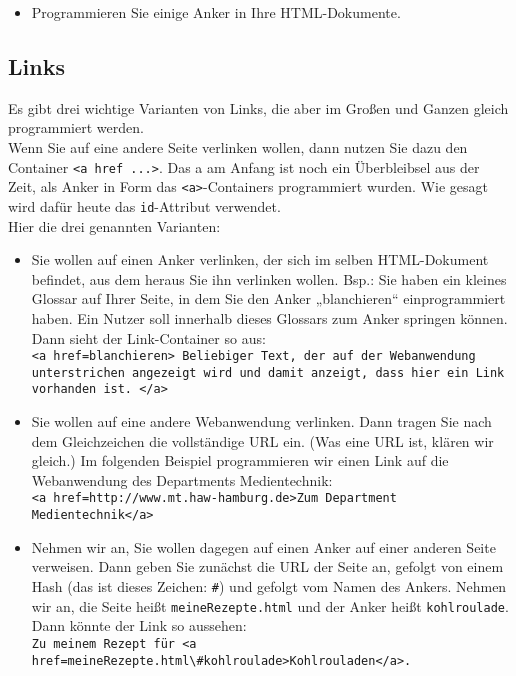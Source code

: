 \begin{itemize}
	\item Programmieren Sie einige Anker in Ihre HTML-Dokumente.
\end{itemize}

\subsection{Links}

Es gibt drei wichtige Varianten von Links, die aber im Großen und Ganzen gleich programmiert werden.\\

Wenn Sie auf eine andere Seite verlinken wollen, dann nutzen Sie dazu den Container \verb|<a href ...>|. Das a am Anfang ist noch ein Überbleibsel aus der Zeit, als Anker in Form das \verb|<a>|-Containers programmiert wurden. Wie gesagt wird dafür heute das \verb|id|-Attribut verwendet.\\

Hier die drei genannten Varianten:

\begin{itemize}
	\item Sie wollen auf einen Anker verlinken, der sich im selben HTML-Dokument befindet, aus dem heraus Sie ihn verlinken wollen. Bsp.: Sie haben ein kleines Glossar auf Ihrer Seite, in dem Sie den Anker „blanchieren“ einprogrammiert haben. Ein Nutzer soll innerhalb dieses Glossars zum Anker springen können. Dann sieht der Link-Container so aus:\\
	\verb|<a href=blanchieren> Beliebiger Text, der auf der Webanwendung unterstrichen angezeigt wird und damit anzeigt, dass hier ein Link vorhanden ist. </a>|\\
	\item Sie wollen auf eine andere Webanwendung verlinken. Dann tragen Sie nach dem Gleichzeichen die vollständige URL ein. (Was eine URL ist, klären wir gleich.) Im folgenden Beispiel programmieren wir einen Link auf die Webanwendung des Departments Medientechnik:\\	
	\verb|<a href=http://www.mt.haw-hamburg.de>Zum Department Medientechnik</a>|\\
	\item Nehmen wir an, Sie wollen dagegen auf einen Anker auf einer anderen Seite verweisen. Dann geben Sie zunächst die URL der Seite an, gefolgt von einem Hash (das ist dieses Zeichen: \verb|#|) und gefolgt vom Namen des Ankers. Nehmen wir an, die Seite heißt \verb|meineRezepte.html| und der Anker heißt \verb|kohlroulade|. Dann könnte der Link so aussehen:\\	
	\verb|Zu meinem Rezept für <a href=meineRezepte.html\#kohlroulade>Kohlrouladen</a>.|
\end{itemize}

